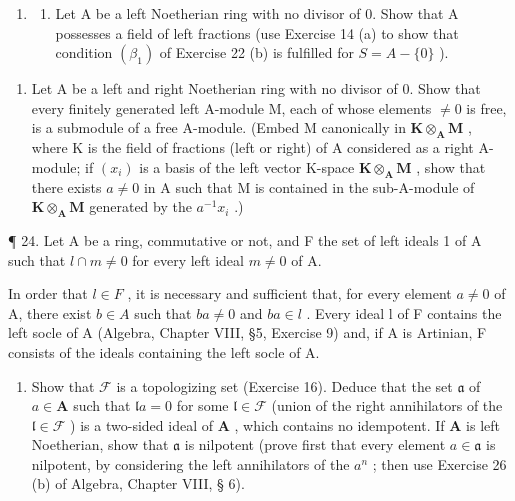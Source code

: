 \begin{enumerate}
\def\labelenumi{\arabic{enumi}.}
\setcounter{enumi}{22}
\tightlist
\item
  \begin{enumerate}
  \def\labelenumii{(\alph{enumii})}
  \tightlist
  \item
    Let A be a left Noetherian ring with no divisor of 0. Show that A possesses a field of left fractions (use Exercise 14 (a) to show that condition \((\beta_{1})\) of Exercise 22 (b) is fulfilled for \(S = A - \{0\}\) ).
  \end{enumerate}
\end{enumerate}

\begin{enumerate}
\def\labelenumi{(\alph{enumi})}
\setcounter{enumi}{1}
\tightlist
\item
  Let A be a left and right Noetherian ring with no divisor of 0. Show that every finitely generated left A-module M, each of whose elements \(\neq 0\) is free, is a submodule of a free A-module. (Embed M canonically in \(\mathbf{K} \otimes_{\mathbf{A}} \mathbf{M}\) , where K is the field of fractions (left or right) of A considered as a right A-module; if \((x_{i})\) is a basis of the left vector K-space \(\mathbf{K} \otimes_{\mathbf{A}} \mathbf{M}\) , show that there exists \(a \neq 0\) in A such that M is contained in the sub-A-module of \(\mathbf{K} \otimes_{\mathbf{A}} \mathbf{M}\) generated by the \(a^{-1}x_{i}\) .)
\end{enumerate}

¶ 24. Let A be a ring, commutative or not, and F the set of left ideals 1 of A such that \(l \cap m \neq 0\) for every left ideal \(m \neq 0\) of A.

In order that \(l \in F\) , it is necessary and sufficient that, for every element \(a \neq 0\) of A, there exist \(b \in A\) such that \(ba \neq 0\) and \(ba \in l\) . Every ideal l of F contains the left socle of A (Algebra, Chapter VIII, §5, Exercise 9) and, if A is Artinian, F consists of the ideals containing the left socle of A.

\begin{enumerate}
\def\labelenumi{(\alph{enumi})}
\tightlist
\item
  Show that \(\mathcal{F}\) is a topologizing set (Exercise 16). Deduce that the set \(\mathfrak{a}\) of \(a \in \mathbf{A}\) such that \(\mathfrak{l}a = 0\) for some \(\mathfrak{l} \in \mathcal{F}\) (union of the right annihilators of the \(\mathfrak{l} \in \mathcal{F}\) ) is a two-sided ideal of \(\mathbf{A}\) , which contains no idempotent. If \(\mathbf{A}\) is left Noetherian, show that \(\mathfrak{a}\) is nilpotent (prove first that every element \(a \in \mathfrak{a}\) is nilpotent, by considering the left annihilators of the \(a^n\) ; then use Exercise 26 (b) of Algebra, Chapter VIII, § 6).
\end{enumerate}

